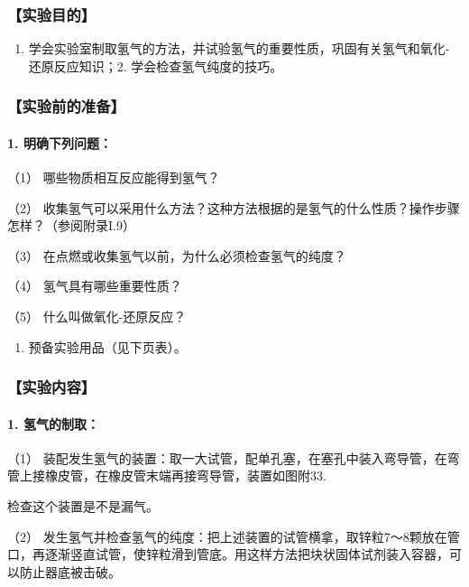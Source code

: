 \subsubsection{【实验目的】}

\begin{enumerate}
\item
  学会实验室制取氢气的方法，并试验氢气的重要性质，巩固有关氢气和氧化-还原反应知识；2.
  学会检查氢气纯度的技巧。
\end{enumerate}

\subsubsection{【实验前的准备】}

\paragraph{1. 明确下列问题：}

（1） 哪些物质相互反应能得到氢气？

（2）
收集氢气可以采用什么方法？这种方法根据的是氢气的什么性质？操作步骤怎样？（参阅附录I.9）

（3） 在点燃或收集氢气以前，为什么必须检查氢气的纯度？

（4） 氢气具有哪些重要性质？

（5） 什么叫做氧化-还原反应？

\begin{enumerate}[start=2]
\item
  预备实验用品（见下页表）。
\end{enumerate}

\subsubsection{【实验内容】}

\paragraph{1. 氢气的制取：}

（1）
装配发生氢气的装置：取一大试管，配单孔塞，在塞孔中装入弯导管，在弯管上接橡皮管，在橡皮管末端再接弯导管，装置如图附33.

检查这个装置是不是漏气。

（2）
发生氢气并检查氢气的纯度：把上述装置的试管横拿，取锌粒7～8颗放在管口，再逐渐竖直试管，使锌粒滑到管底。用这样方法把块状固体试剂装入容器，可以防止器底被击破。

